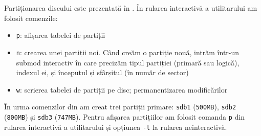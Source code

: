 Partiționarea discului este prezentată în .
În rularea interactivă a utilitarului  am folosit comenzile:
\begin{itemize}
  \item \texttt{p}: afișarea tabelei de partiții
  \item \texttt{n}: crearea unei partiții noi.
    Când creăm o partiție nouă, intrăm într-un submod interactiv în care precizăm tipul partiției (primară sau logică), indexul ei, și începutul și sfârșitul (în număr de sector)
  \item \texttt{w}: scrierea tabelei de partiții pe disc;
    permanentizarea modificărilor
\end{itemize}

În urma comenzilor din  am creat trei partiții primare: \texttt{sdb1} (\texttt{500MB}), \texttt{sdb2} (\texttt{800MB}) și \texttt{sdb3} (\texttt{747MB}).
Pentru afișarea partițiilor am folosit comanda \texttt{p} din rularea interactivă a utilitarului  și opțiunea \texttt{-l} la rularea neinteractivă.

